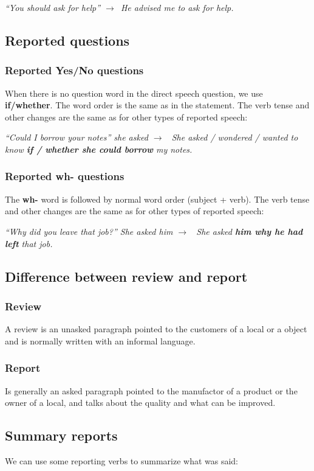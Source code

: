 \documentclass{article}
\newcommand{\tox}{$\longrightarrow$\ }
\begin{document}
\textit{``You should ask for help'' \tox He advised me to ask for help.}

\subsection{Reported questions}
\subsubsection{Reported Yes/No questions}
When there is no question word in the direct speech question, we use
\textbf{if/whether}. The word order is the same as in the statement.
The verb tense and other changes are the same as for other types of
reported speech:

\textit{``Could I borrow your notes'' she asked \tox
She asked / wondered / wanted to know \textbf{if / whether she could
borrow} my notes.}

\subsubsection{Reported wh- questions}
The \textbf{wh-} word is followed by normal word order (subject + verb).
The verb tense and other changes are the same as for other types of
reported speech:

\textit{``Why did you leave that job?'' She asked him \tox
She asked \textbf{him why he had left} that job.}

\subsection{Difference between review and report}
\subsubsection{Review}
A review is an unasked paragraph pointed to the customers of a local
or a object and is normally written with an informal language.

\subsubsection{Report}
Is generally an asked paragraph pointed to the manufactor of a product or the
owner of a local, and talks about the quality and what can be improved.

\subsection{Summary reports}
We can use some reporting verbs to summarize what was said:
\end{document}
